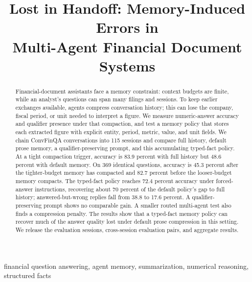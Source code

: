 \documentclass[conference,a4paper]{IEEEtran}
\begin{document}
\title{Lost in Handoff: Memory-Induced Errors in\\Multi-Agent Financial Document Systems}

\author{
}

\maketitle

\begin{abstract}
Financial-document assistants face a memory constraint: context budgets are finite, while an analyst's questions can span many filings and sessions. To keep earlier exchanges available, agents compress conversation history; this can lose the company, fiscal period, or unit needed to interpret a figure. We measure numeric-answer accuracy and qualifier presence under that compaction, and test a memory policy that stores each extracted figure with explicit entity, period, metric, value, and unit fields. We chain ConvFinQA conversations into 115 sessions and compare full history, default prose memory, a qualifier-preserving prompt, and this accumulating typed-fact policy. At a tight compaction trigger, accuracy is 83.9 percent with full history but 48.6 percent with default memory. On 369 identical questions, accuracy is 45.3 percent after the tighter-budget memory has compacted and 82.7 percent before the looser-budget memory compacts. The typed-fact policy reaches 72.4 percent accuracy under forced-answer instructions, recovering about 70 percent of the default policy's gap to full history; answered-but-wrong replies fall from 38.8 to 17.6 percent. A qualifier-preserving prompt shows no comparable gain. A smaller routed multi-agent test also finds a compression penalty. The results show that a typed-fact memory policy can recover much of the answer quality lost under default prose compression in this setting. We release the evaluation sessions, cross-session evaluation pairs, and aggregate results.
\end{abstract}

\begin{IEEEkeywords}
financial question answering, agent memory, summarization, numerical reasoning, structured facts
\end{IEEEkeywords}
\end{document}

